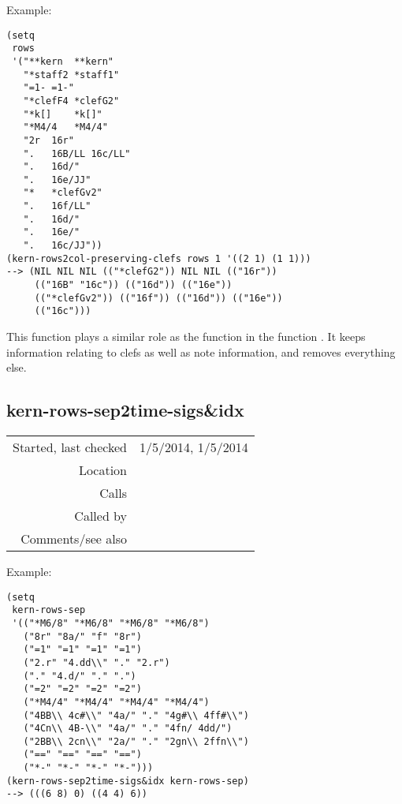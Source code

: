 \vspace{0.5cm}
\noindent Example:
\begin{verbatim}
(setq
 rows
 '("**kern	**kern"
   "*staff2	*staff1"
   "=1-	=1-"
   "*clefF4	*clefG2"
   "*k[]	*k[]"
   "*M4/4	*M4/4"
   "2r	16r"
   ".	16B/LL 16c/LL"
   ".	16d/"
   ".	16e/JJ"
   "*	*clefGv2"
   ".	16f/LL"
   ".	16d/"
   ".	16e/"
   ".	16c/JJ"))
(kern-rows2col-preserving-clefs rows 1 '((2 1) (1 1)))
--> (NIL NIL NIL (("*clefG2")) NIL NIL (("16r"))
     (("16B" "16c")) (("16d")) (("16e"))
     (("*clefGv2")) (("16f")) (("16d")) (("16e"))
     (("16c")))
\end{verbatim}

\noindent This function plays a similar role as the
function  in the function
. It keeps
information relating to clefs as well as note
information, and removes everything else.


\subsection*{kern-rows-sep2time-sigs\&idx}\label{fun:kern-rows-sep2time-sigs-n-idx}

\vspace{0.3cm}
\begin{tabular}{r|p{8cm}}
Started, last checked & 1/5/2014, 1/5/2014 \\
Location & \nameref{sec:kern-to-staff-features} \\
Calls & \\
Called by & \nameref{fun:kern-file2ontimes-signatures} \\
Comments/see also &
\end{tabular}

\vspace{0.5cm}
\noindent Example:
\begin{verbatim}
(setq
 kern-rows-sep
 '(("*M6/8" "*M6/8" "*M6/8" "*M6/8")
   ("8r" "8a/" "f" "8r")
   ("=1" "=1" "=1" "=1")
   ("2.r" "4.dd\\" "." "2.r")
   ("." "4.d/" "." ".")
   ("=2" "=2" "=2" "=2")
   ("*M4/4" "*M4/4" "*M4/4" "*M4/4")
   ("4BB\\ 4c#\\" "4a/" "." "4g#\\ 4ff#\\")
   ("4Cn\\ 4B-\\" "4a/" "." "4fn/ 4dd/")
   ("2BB\\ 2cn\\" "2a/" "." "2gn\\ 2ffn\\")
   ("==" "==" "==" "==")
   ("*-" "*-" "*-" "*-")))
(kern-rows-sep2time-sigs&idx kern-rows-sep)
--> (((6 8) 0) ((4 4) 6))
\end{verbatim}

